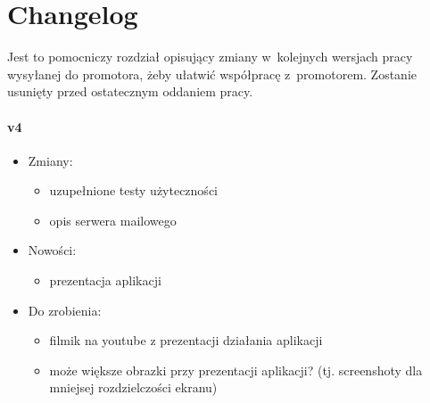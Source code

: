 \chapter*{Changelog}\label{ch:changelog}

Jest to pomocniczy rozdział opisujący zmiany w~kolejnych wersjach pracy wysyłanej do promotora, żeby ułatwić współpracę z~promotorem.
Zostanie usunięty przed ostatecznym oddaniem pracy.

\subsubsection{v4}
\begin{itemize}
\item Zmiany:
    \begin{itemize}
    	\item uzupełnione testy użyteczności
    	\item opis serwera mailowego
	\end{itemize}
\item Nowości:
    \begin{itemize}
		\item prezentacja aplikacji
	\end{itemize}
\item Do zrobienia:
    \begin{itemize}
        \item filmik na youtube z prezentacji działania aplikacji
        \item może większe obrazki przy prezentacji aplikacji? (tj. screenshoty dla mniejsej rozdzielczości ekranu)
    \end{itemize}
\end{itemize}

